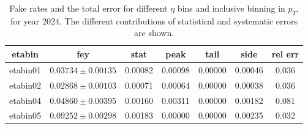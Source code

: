 \begin{table}
  \centering
  \begin{tabular}{|c|c|c|c|c|c|c|} \hline
    etabin & fey & stat & peak & tail & side & rel err  \\ \hline
etabin01 & $0.03734 \pm 0.00135$ & 0.00082  & 0.00098  & 0.00000  & 0.00046 & 0.036 \\
etabin02 & $0.02868 \pm 0.00103$ & 0.00071  & 0.00064  & 0.00000  & 0.00038 & 0.036 \\
etabin04 & $0.04860 \pm 0.00395$ & 0.00160  & 0.00311  & 0.00000  & 0.00182 & 0.081 \\
etabin05 & $0.09252 \pm 0.00298$ & 0.00183  & 0.00000  & 0.00000  & 0.00235 & 0.032 \\
    \hline
  \end{tabular}
  \caption{Fake rates and the total error for different $\eta$ bins and inclusive binning in $p_T$, for year 2024. The different contributions of statistical and systematic errors are shown.}
  \label{tab:efy-results-2024}
\end{table}

